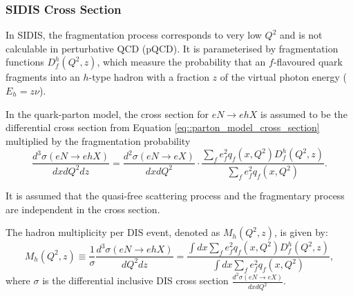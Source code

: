 \subsubsection{SIDIS Cross Section}
\label{10.21::sidis_cross_section}
    In SIDIS, the fragmentation process corresponds to very low $Q^2$ and is not calculable in perturbative QCD (pQCD).
    It is parameterised by fragmentation functions $D_f^h(Q^2, z)$, which measure the probability that an $f$-flavoured quark fragments into an $h$-type hadron with a fraction $z$ of the virtual photon energy ($E_h = z\nu$).

    In the quark-parton model, the cross section for $eN \rightarrow ehX$ is assumed to be the differential cross section from Equation \eqref{eq::parton_model_cross_section} multiplied by the fragmentation probability
    \begin{equation}
        \label{eq::fragmentation_probability}
        \frac{d^3\sigma(eN \rightarrow ehX)}{dxdQ^2dz} =
            \frac{d^2\sigma(eN \rightarrow eX)}{dxdQ^2} \cdot
            \frac{\sum_f e^2_f q_f(x,Q^2) D^h_f(Q^2,z)}{\sum_f e^2_f q_f(x,Q^2)}.
    \end{equation}

    It is assumed that the quasi-free scattering process and the fragmentary process are independent in the cross section.

    The hadron multiplicity per DIS event, denoted as $M_h(Q^2, z)$, is given by:
    \begin{equation*}
        M_h(Q^2,z) \equiv \frac{1}{\sigma} \frac{d^3\sigma(eN \rightarrow ehX)}{dQ^2dz} = \frac{\int dx \sum_f e^2_f q_f(x,Q^2) D^h_f(Q^2,z)}{\int dx \sum_f e^2_f q_f(x,Q^2)},
    \end{equation*}
    where $\sigma$ is the differential inclusive DIS cross section $\frac{d^2\sigma(eN \rightarrow eX)}{dxdQ^2}$.
